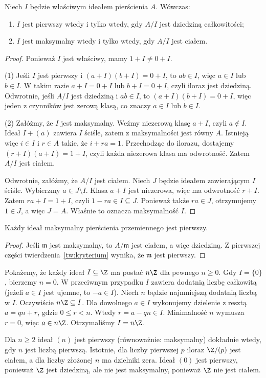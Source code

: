 \begin{twierdzenie}
\label{tw:kryterium}
Niech $I$ będzie właściwym ideałem pierścienia $A$.
Wówczas:
\begin{enumerate}[label=\arabic*)]
\item $I$ jest pierwszy wtedy i tylko wtedy, gdy $A/I$ jest dziedziną całkowitości;
\item $I$ jest maksymalny wtedy i tylko wtedy, gdy $A/I$ jest ciałem.
\end{enumerate}
\end{twierdzenie}
\begin{proof}
Ponieważ $I$ jest właściwy, mamy $1+I\ne0+I$.

(1) Jeśli $I$ jest pierwszy i $(a+I)(b+I)=0+I$,
to $ab\in I$, więc $a\in I$ lub $b\in I$.
W takim razie $a+I=0+I$ lub $b+I=0+I$, czyli iloraz jest dziedziną.
Odwrotnie, jeśli $A/I$ jest dziedziną i $ab\in I$, to
$(a+I)(b+I)=0+I$, więc jeden z czynników jest zerową klasą,
co znaczy $a\in I$ lub $b\in I$.

(2) Załóżmy, że $I$ jest maksymalny. Weźmy niezerową klasę $a+I$,
czyli $a\notin I$. Ideał $I+(a)$ zawiera $I$ ściśle,
zatem z maksymalności jest równy $A$.
Istnieją więc $i\in I$ i $r\in A$ takie, że $i+ra=1$.
Przechodząc do ilorazu, dostajemy
$(r+I)(a+I)=1+I$, czyli każda niezerowa klasa ma odwrotność.
Zatem $A/I$ jest ciałem.

Odwrotnie, załóżmy, że $A/I$ jest ciałem.
Niech $J$ będzie ideałem zawierającym $I$ ściśle.
Wybierzmy $a\in J\setminus I$. Klasa $a+I$ jest niezerowa,
więc ma odwrotność $r+I$. Zatem $ra+I=1+I$, czyli $1-ra\in I\subseteq J$.
Ponieważ także $ra\in J$, otrzymujemy $1\in J$, a więc $J=A$.
Właśnie to oznacza maksymalność $I$.
\end{proof}

\begin{wniosek}
Każdy ideał maksymalny pierścienia przemiennego jest pierwszy.
\end{wniosek}
\begin{proof}
Jeśli $\mathfrak m$ jest maksymalny, to $A/\mathfrak m$ jest ciałem,
a więc dziedziną. Z pierwszej części twierdzenia~\ref{tw:kryterium}
wynika, że $\mathfrak m$ jest pierwszy.
\end{proof}

\begin{przyklad}[Ideały w $\Z$]
Pokażemy, że każdy ideał $I\subseteq\Z$ ma postać $n\Z$ dla pewnego
$n\ge0$. Gdy $I=\{0\}$, bierzemy $n=0$.
W przeciwnym przypadku $I$ zawiera dodatnią liczbę całkowitą
(jeżeli $a\in I$ jest ujemne, to $-a\in I$). Niech $n$ będzie
najmniejszą dodatnią liczbą w $I$.
Oczywiście $n\Z\subseteq I$. Dla dowolnego $a\in I$ wykonujemy
dzielenie z resztą $a=qn+r$, gdzie $0\le r<n$.
Wtedy $r=a-qn\in I$. Minimalność $n$ wymusza $r=0$,
więc $a\in n\Z$. Otrzymaliśmy $I=n\Z$.

Dla $n\ge2$ ideał $(n)$ jest pierwszy (równoważnie: maksymalny)
dokładnie wtedy, gdy $n$ jest liczbą pierwszą.
Istotnie, dla liczby pierwszej $p$ iloraz $\Z/(p)$ jest ciałem,
a dla liczby złożonej $n$ ma dzielniki zera.
Ideał $(0)$ jest pierwszy, ponieważ $\Z$ jest dziedziną,
ale nie jest maksymalny, ponieważ $\Z$ nie jest ciałem.
\end{przyklad}

